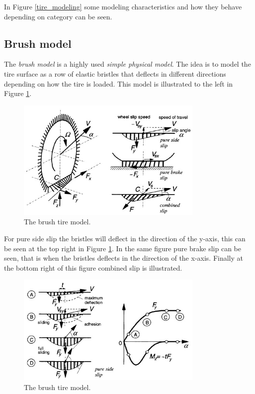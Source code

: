 In Figure \ref{tire_modeling} some modeling characteristics and how they behave depending on category can be seen.

\subsection{Brush model}
\label{sec:brush}
The \textit{brush model} is a highly used \textit{simple physical model}. The idea is to model the tire surface as a row of elastic bristles that deflects in different directions depending on how the tire is loaded. This model is illustrated to the left in Figure \ref{brush1}.

\begin{figure}[h]
	\centering
	\includegraphics[width=0.8\textwidth]{Pictures/brush1}
	\caption{The brush tire model. \cite{pacejka}}
	\label{brush1}
\end{figure}

For pure side slip the bristles will deflect in the direction of the y-axis, this can be seen at the top right in Figure \ref{brush1}. In the same figure pure brake slip can be seen, that is when the bristles deflects in the direction of the x-axis. Finally at the bottom right of this figure combined slip is illustrated.

\begin{figure}[h]
	\centering
	\includegraphics[width=0.8\textwidth]{Pictures/brush2}
	\caption{The brush tire model. \cite{pacejka}}
	\label{brush2}
\end{figure}

